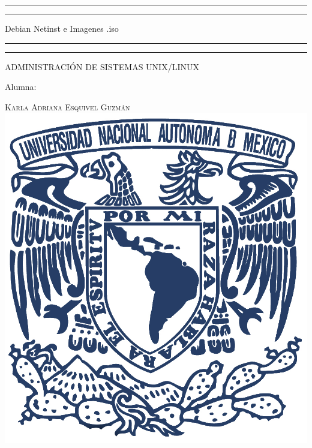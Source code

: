 \documentclass[a4paper, 11pt, oneside]{article}
\begin{document}
 

\begin{titlepage} 

	\centering 
	
	\scshape 
	
	\vspace*{\baselineskip} 
	
	
	
	\rule{\textwidth}{1.6pt}\vspace*{-\baselineskip}\vspace*{2pt} 
	\rule{\textwidth}{0.4pt} 
	
	\vspace{0.75\baselineskip} 
	
	{\LARGE Debian Netinst e Imagenes .iso}	
	\vspace{0.75\baselineskip} 
	
	\rule{\textwidth}{0.4pt}\vspace*{-\baselineskip}\vspace{3.2pt}
	\rule{\textwidth}{1.6pt} 
	
	\vspace{2\baselineskip} 
	

	ADMINISTRACIÓN DE SISTEMAS UNIX/LINUX
	
	\vspace*{3\baselineskip} 
	
	
	
	Alumna:
	
	\vspace{0.5\baselineskip} 
	
	{\scshape\Large Karla Adriana Esquivel Guzmán \\} 
	\vspace{0.5\baselineskip} 
	\vfill
	\includegraphics{unam.jpg}
	

\end{titlepage}
\end{document}
